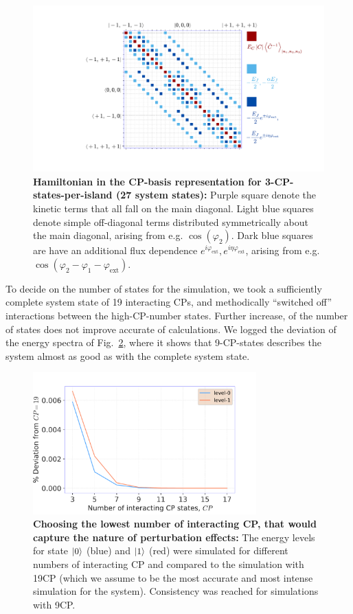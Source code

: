 \documentclass[%
superscriptaddress,
preprint,
preprintnumbers,
bibnotes,
amsmath,
amssymb,
aps,
showkeys,
prb,
]{revtex4-1}
\newcommand{\iket}[1]{\ensuremath{\Ket{#1}}}
\begin{document}
\begin{figure}[h]
  \includegraphics[width=120mm]{fig4}
  \caption{\small \textbf{Hamiltonian in the CP-basis representation for 3-CP-states-per-island (27 system states):} Purple square denote the kinetic terms that all fall on the main diagonal. Light blue squares denote simple off-diagonal terms distributed symmetrically about the main diagonal, arising from e.g. $\cos(\varphi_2)$. Dark blue squares are have an additional flux dependence $e^{i\varphi_{\text{ext}}}, e^{i\eta\varphi_{\text{ext}}}$, arising from e.g. $\cos(\varphi_2-\varphi_1-\varphi_{\text{ext}})$.
    \label{fig:matrix_representation} }
\end{figure}


To decide on the number of states for the simulation, we took a sufficiently complete system state of 19 interacting CPs, and methodically ``switched off'' interactions between the high-CP-number states. Further increase, of the number of states does not improve accurate of calculations. We logged the deviation of the energy spectra of Fig.~\ref{fig:minimum_number}, where it shows that 9-CP-states describes the system almost as good as with the complete system state.

\begin{figure}[h]
  \includegraphics[width=86mm]{fig7}
  \caption{\small \textbf{Choosing the lowest number of interacting CP, that would  capture the nature of perturbation effects:} The energy levels for state \iket{0} (blue) and \iket{1} (red) were simulated for different numbers of interacting CP and compared to the simulation with 19CP (which we assume to be the most accurate and most intense simulation for the system). Consistency was reached for simulations with 9CP.
    \label{fig:minimum_number} }
\end{figure}
\end{document}
